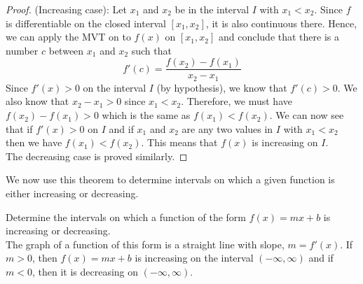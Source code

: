 \documentclass[handout]{ximera}
\begin{document}
\begin{proof} (Increasing case): Let $x_1$ and $x_2$ be in the interval $I$ with $x_1 < x_2$.  
Since $f$ is differentiable on the closed interval 
$[x_1, x_2]$, it is also continuous there.  
Hence, we can apply the MVT on to $f(x)$ on $[x_1, x_2]$ and conclude that there is a number $c$
between $x_1$ and $x_2$ such that 
\[
f'(c) = \frac{f(x_2) - f(x_1)}{x_2 - x_1}\]
Since $f'(x) > 0$ on the interval $I$ (by hypothesis), we know that $f'(c) >0$.
We also know that $x_2 - x_1 > 0$ since $x_1 < x_2$. Therefore, we must have
$f(x_2) - f(x_1) > 0$ which is the same as $f(x_1) < f(x_2)$.  
We can now see that if $f'(x) > 0$ on $I$ and if $x_1$ and $x_2$ are any 
two values in $I$ with $x_1 < x_2$ then we have $f(x_1) < f(x_2)$.
This means that $f(x)$ is increasing on $I$.\\
The decreasing case is proved similarly.
\end{proof}


We now use this theorem to determine intervals on which a given function is 
either increasing or decreasing.


\begin{example}[example 1]
Determine the intervals on which a function of the form $f(x) = mx + b$ is 
increasing or decreasing.\\
The graph of a function of this form is a straight line with slope, $m=f'(x) $.
If $m > 0$, then $f(x) = mx+b$ is increasing on the interval $(-\infty, \infty)$  
and if $m < 0$, then it is decreasing on $(-\infty, \infty)$.

\begin{center}
\hspace{1.5 in}

\end{center}

\end{example}
\end{document}

